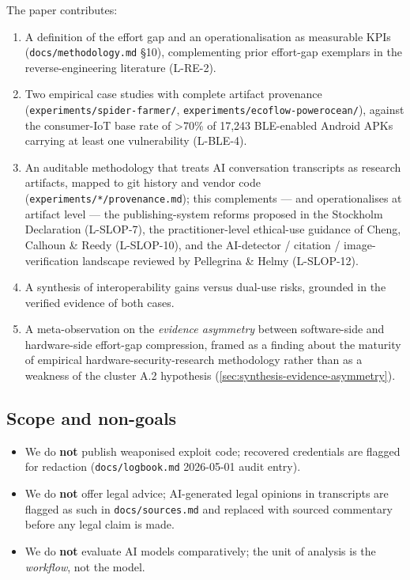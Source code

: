\documentclass[11pt,a4paper]{article}
\begin{document}
The paper contributes:
\begin{enumerate}
  \item A definition of the effort gap and an operationalisation as
        measurable KPIs (\texttt{docs/methodology.md} \S 10), complementing
        prior effort-gap exemplars in the reverse-engineering literature
        (L-RE-2).
  \item Two empirical case studies with complete artifact provenance
        (\texttt{experiments/spider-farmer/},
        \texttt{experiments/ecoflow-powerocean/}), against the consumer-IoT
        base rate of \textgreater{}70\% of 17{,}243 BLE-enabled Android APKs
        carrying at least one vulnerability (L-BLE-4).
  \item An auditable methodology that treats AI conversation transcripts as
        research artifacts, mapped to git history and vendor code
        (\texttt{experiments/*/provenance.md}); this complements --- and
        operationalises at artifact level --- the publishing-system reforms
        proposed in the Stockholm Declaration (L-SLOP-7), the
        practitioner-level ethical-use guidance of Cheng, Calhoun \&
        Reedy (L-SLOP-10), and the AI-detector / citation /
        image-verification landscape reviewed by Pellegrina \& Helmy
        (L-SLOP-12).
  \item A synthesis of interoperability gains versus dual-use risks, grounded
        in the verified evidence of both cases.
  \item A meta-observation on the \emph{evidence asymmetry} between
        software-side and hardware-side effort-gap compression, framed
        as a finding about the maturity of empirical
        hardware-security-research methodology rather than as a
        weakness of the cluster A.2 hypothesis
        (\cref{sec:synthesis-evidence-asymmetry}).
\end{enumerate}

\subsection{Scope and non-goals}
\label{sec:scope}
\label{sec:scope-non-goals}
\begin{itemize}
  \item We do \textbf{not} publish weaponised exploit code; recovered
        credentials are flagged for redaction (\texttt{docs/logbook.md}
        2026-05-01 audit entry).
  \item We do \textbf{not} offer legal advice; AI-generated legal opinions
        in transcripts are flagged as such in \texttt{docs/sources.md} and
        replaced with sourced commentary before any legal claim is made.
  \item We do \textbf{not} evaluate AI models comparatively; the unit of
        analysis is the \emph{workflow}, not the model.
\end{itemize}
\end{document}
